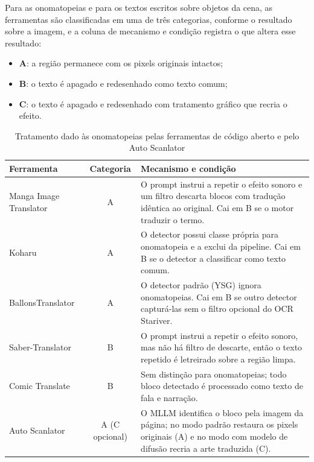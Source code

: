\documentclass[
    12pt,
    openright,
    oneside,
    a4paper,
    chapter=TITLE,
    section=TITLE,
    english,
    brazilian,
    brazil
]{abntex2}
\renewcommand{\footnotesize}{\fontsize{10pt}{12pt}\selectfont}
\begin{document}
Para as onomatopeias e para os textos escritos sobre objetos da cena, as ferramentas são classificadas em uma de três categorias, conforme o resultado sobre a imagem, e a coluna de mecanismo e condição registra o que altera esse resultado:

\begin{itemize}
    \item \textbf{A}: a região permanece com os pixels originais intactos;
    \item \textbf{B}: o texto é apagado e redesenhado como texto comum;
    \item \textbf{C}: o texto é apagado e redesenhado com tratamento gráfico que recria o efeito.
\end{itemize}

\begin{table}[htb]
    \caption{Tratamento dado às onomatopeias pelas ferramentas de código aberto e pelo Auto Scanlator}
    \label{tab:comparacao-onomatopeias}
    \centering
    \footnotesize
    \setlength{\tabcolsep}{4pt}
    \renewcommand{\arraystretch}{1.25}
    \begin{tabular}{|p{3.5cm}|c|p{10.0cm}|}
        \hline
        \textbf{Ferramenta} & \textbf{Categoria} & \textbf{Mecanismo e condição} \\
        \hline
        \hline
        Manga Image Translator & A & O prompt instrui a repetir o efeito sonoro e um filtro descarta blocos com tradução idêntica ao original. Cai em B se o motor traduzir o termo. \\
        \hline
        Koharu & A & O detector possui classe própria para onomatopeia e a exclui da pipeline. Cai em B se o detector a classificar como texto comum. \\
        \hline
        BallonsTranslator & A & O detector padrão (YSG) ignora onomatopeias. Cai em B se outro detector capturá-las sem o filtro opcional do OCR Stariver. \\
        \hline
        Saber-Translator & B & O prompt instrui a repetir o efeito sonoro, mas não há filtro de descarte, então o texto repetido é letreirado sobre a região limpa. \\
        \hline
        Comic Translate & B & Sem distinção para onomatopeias; todo bloco detectado é processado como texto de fala e narração. \\
        \hline
        Auto Scanlator & A (C opcional) & O MLLM identifica o bloco pela imagem da página; no modo padrão restaura os pixels originais (A) e no modo com modelo de difusão recria a arte traduzida (C). \\
        \hline
    \end{tabular}
\end{table}
\end{document}
